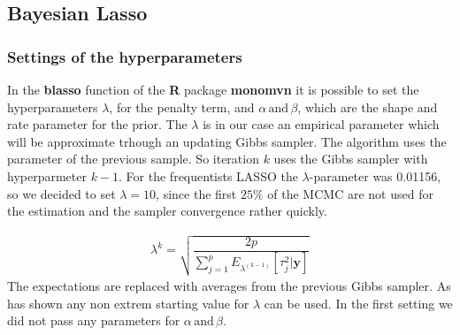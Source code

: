 \documentclass[12pt,a4paper]{article}
\begin{document}
\hypertarget{bayesian-lasso-1}{%
\subsection{Bayesian Lasso}\label{bayesian-lasso-1}}

\hypertarget{settings-of-the-hyperparameters}{%
\subsubsection{Settings of the
hyperparameters}\label{settings-of-the-hyperparameters}}

In the \textbf{blasso} function of the \textbf{R} package
\textbf{monomvn} it is possible to set the hyperparameters \(\lambda\),
for the penalty term, and \(\alpha \, \text{and} \, \beta\), which are
the shape and rate parameter for the prior. The \(\lambda\) is in our
case an empirical parameter which will be approximate trhough an
updating Gibbs sampler. The algorithm uses the parameter of the previous
sample. So iteration \(k\) uses the Gibbs sampler with hyperparmeter
\(k-1\). For the frequentists \ac{LASSO} the \(\lambda\)-parameter was
0.01156, so we decided to set \(\lambda = 10\), since the first
\(25 \%\) of the \ac{MCMC} are not used for the estimation and the
sampler convergence rather quickly. \autocite{gramacy_monomvn_2019}

\FloatBarrier

\begin{align*} 
  \lambda^{k} = \sqrt{\dfrac{2p}{\displaystyle \sum_{j = 1}^{p} E_{\lambda^{(k-1)}} [\tau_j^2| \pmb{y}] }}
\end{align*} \FloatBarrier The expectations are replaced with averages
from the previous Gibbs sampler. As \textcite{park_bayesian_2008} has
shown any non extrem starting value for \(\lambda\) can be used. In the
first setting we did not pass any parameters for
\(\alpha \, \text{and} \, \beta\).
\end{document}
